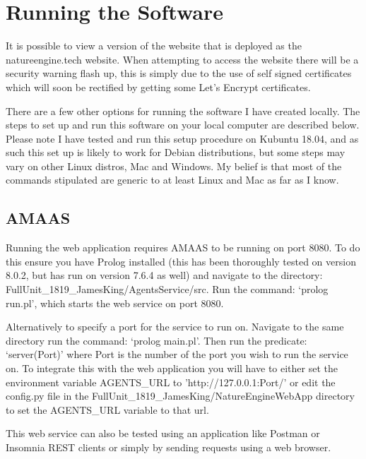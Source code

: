 \documentclass[]{final_report}
\begin{document}
\section{Running the Software}
It is possible to view a version of the website that is deployed as the natureengine.tech website. When attempting to access the website there will be a security warning flash up, this is simply due to the use of self signed certificates which will soon be rectified by getting some Let's Encrypt certificates.\par 
There are a few other options for running the software I have created locally. The steps to set up and run this software on your local computer are described below. Please note I have tested and run this setup procedure on Kubuntu 18.04, and as such this set up is likely to work for Debian distributions, but some steps may vary on other Linux distros, Mac and Windows. My belief is that most of the commands stipulated are generic to at least Linux and Mac as far as I know.

\subsection{AMAAS}
Running the web application requires AMAAS to be running on port 8080. To do this ensure you have Prolog installed (this has been thoroughly tested on version 8.0.2, but has run on version 7.6.4 as well) and navigate to the directory:\\ FullUnit\_1819\_JamesKing/AgentsService/src. Run the command: `prolog run.pl', which starts the web service on port 8080.\par 
Alternatively to specify a port for the service to run on. Navigate to the same directory run the command: `prolog main.pl'. Then run the predicate: `server(Port)' where Port is the number of the port you wish to run the service on. To integrate this with the web application you will have to either set the environment variable AGENTS\_URL to 'http://127.0.0.1:Port/' or edit the config.py file in the FullUnit\_1819\_JamesKing/NatureEngineWebApp directory to set the AGENTS\_URL variable to that url.\par 
This web service can also be tested using an application like Postman or Insomnia REST clients or simply by sending requests using a web browser. 
\end{document}
